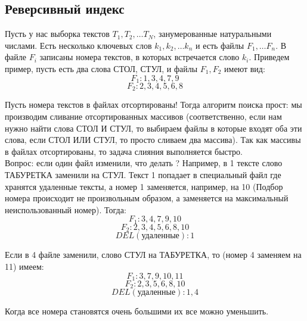 \subsection {Реверсивный индекс}
Пусть у нас выборка текстов $T_1, T_2, \dots T_{N}$, занумерованные натуральными числами. Есть несколько ключевых слов $k_1, k_2, \dots k_n$ и есть файлы $F_1, \dots F_n$. В файле $F_i$ записаны номера текстов, в которых встречается слово $k_i$. Приведем пример, пусть есть два слова СТОЛ, СТУЛ, и файлы $F_1, F_2$  имеют вид: \\
$$ F_1: 1,3,4,7,9 $$
$$ F_2: 2,3,4,5,6,8 $$

Пусть номера текстов в файлах отсортированы!
Тогда алгоритм поиска прост: мы производим сливание отсортированных массивов (соответственно, если нам нужно найти слова СТОЛ И СТУЛ, то выбираем файлы в которые входят оба эти слова, если  СТОЛ ИЛИ СТУЛ, то просто сливаем два массива). Так как массивы в файлах отсортированы, то задача слияния выполняется быстро.\\
Вопрос: если один файл изменили, что делать ? Например, в 1 тексте слово ТАБУРЕТКА заменили на СТУЛ. Текст 1 попадает в специальный файл где хранятся удаленные тексты, а номер 1 заменяется, например, на 10 (Подбор номера происходит не произвольным образом, а заменяется на максимальный неиспользованный номер). Тогда:
$$ F_1: 3,4,7,9, 10 $$
$$ F_2: 2,3,4,5,6,8,10 $$
$$DEL (\text{удаленные}): 1$$

Если в 4 файле заменили, слово СТУЛ на ТАБУРЕТКА, то (номер 4 заменяем на 11) имеем:
$$ F_1: 3,7,9, 10, 11 $$
$$ F_2: 2,3,5,6,8,10 $$
$$DEL (\text{удаленные}): 1, 4$$

Когда все номера становятся очень большими их все можно уменьшить.